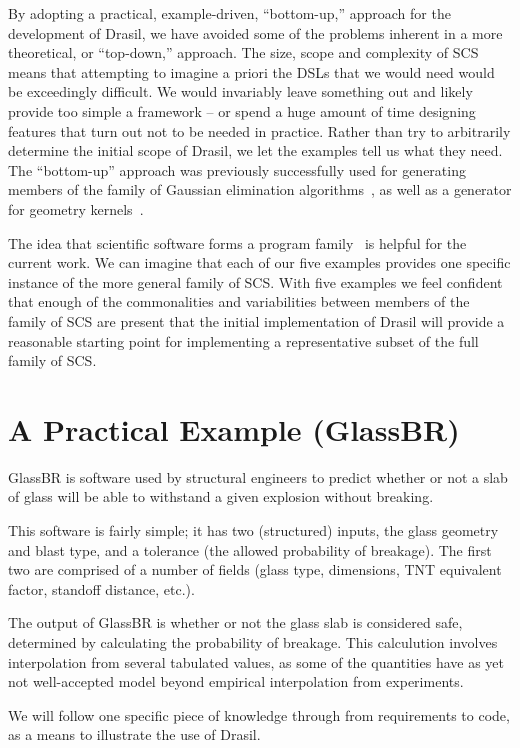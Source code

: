 \documentclass[sigconf]{acmart}
\begin{document}
By adopting a practical, example-driven, ``bottom-up,'' approach for the
development of Drasil, we have avoided some of the problems inherent in a more
theoretical, or ``top-down,'' approach.  The size, scope and complexity of SCS
means that attempting to imagine a priori the DSLs that we would need would be
exceedingly difficult.  We would invariably leave something out and likely
provide too simple a framework -- or spend a huge amount of time designing
features that turn out not to be needed in practice.  Rather than try to
arbitrarily determine the initial scope of Drasil, we let the examples tell us
what they need. The ``bottom-up'' approach was previously successfully used for
generating members of the family of Gaussian elimination
algorithms~\cite{Carette2006}, as well as a generator for geometry
kernels~\cite{CaretteEtAl2011}.

The idea that scientific software forms a program
family~\cite{SmithMcCutchanAndCao2007} is helpful for the current work.  We can
imagine that each of our five examples provides one specific instance of the
more general family of SCS.  With five examples we feel confident that enough of
the commonalities and variabilities between members of the family of SCS are
present that the initial implementation of Drasil will provide a reasonable
starting point for implementing a representative subset of the full family of
SCS.

\section{A Practical Example (GlassBR)} \label{SecGlassBR}

GlassBR is software used by structural engineers to predict whether or 
not a slab of glass will be able to withstand a given explosion without
breaking.  

This software is fairly simple; it has two (structured) inputs, the 
glass geometry and blast type, and a tolerance (the allowed probability
of breakage). The first two are comprised of
a number of fields (glass type, dimensions, TNT equivalent factor, 
standoff distance, etc.).

The output of GlassBR is whether or not the glass slab is considered safe,
determined by calculating the probability of breakage.  This calculution involves
interpolation from several tabulated values, as some of the quantities have
as yet not well-accepted model beyond empirical interpolation from experiments.

We will follow one specific piece of knowledge through from requirements to
code, as a means to illustrate the use of Drasil.
\end{document}
